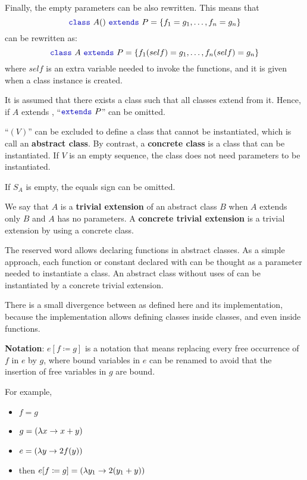 Finally, the empty parameters can be also rewritten.
This means that
\[\sodaclass\ A() \ \sodaextends\ P = \{
f_{1} = g_{1},
\ldots ,
f_{n} = g_{n}
\}
\]
can be rewritten as:
\[\sodaclass\ A \ \sodaextends\ P = \{
f_{1}(self) = g_{1},
\ldots ,
f_{n}(self) = g_{n}
\}
\]
where $self$ is an extra variable needed to invoke the functions, and it is given when a class instance is created.

It is assumed that there exists a class  such that all classes extend from it.
Hence, if $A$ extends , ``$\sodaextends\ P$'' can be omitted.

``$(V)$'' can be excluded to define a class that cannot be instantiated, which is call an \textbf{abstract class}.
By contrast, a \textbf{concrete class} is a class that can be instantiated.
If $V$ is an empty sequence, the class does not need parameters to be instantiated.

If $S_{A}$ is empty, the equals sign can be omitted.

We say that $A$ is a \textbf{trivial extension} of an abstract class $B$ when $A$ extends only $B$ and $A$ has no parameters.
A \textbf{concrete trivial extension} is a trivial extension by using a concrete class.

The \sodahas reserved word allows declaring functions in abstract classes.
As a simple approach, each function or constant declared with \sodahas can be thought as a parameter needed to instantiate a class.
An abstract class without uses of \sodahas can be instantiated by a concrete trivial extension.

There is a small divergence between \Soda as defined here and its implementation, because the implementation allows defining classes inside classes, and even inside functions.

\textbf{Notation}: $e[f \coloneqq g]$ is a notation that means replacing every free occurrence of $f$ in $e$ by $g$, where bound variables in $e$ can be renamed to avoid that the insertion of free variables in $g$ are bound.

For example,
\begin{itemize}
    \item $f = g$
    \item $g = (\lambda {x} \to {x + y})$
    \item $e = (\lambda {y} \to {2 f(y)})$
    \item then $e[f \coloneqq g] = (\lambda {y_{1}} \to {2 (y_{1} + y)})$
\end{itemize}

